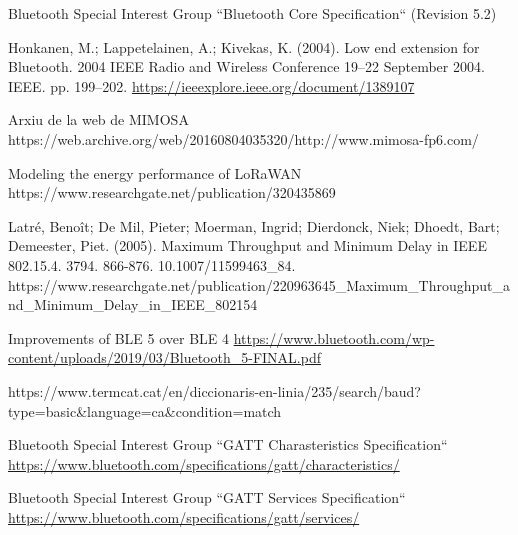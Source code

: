 \begin{thebibliography}{2}


Bluetooth Special Interest Group
``Bluetooth Core Specification``
(Revision 5.2)

Honkanen, M.; Lappetelainen, A.; Kivekas, K. (2004). Low end extension for Bluetooth. 2004 IEEE Radio and Wireless Conference 19–22 September 2004. IEEE. pp. 199–202. \href{https://ieeexplore.ieee.org/document/1389107}{https://ieeexplore.ieee.org/document/1389107}

Arxiu de la web de MIMOSA
https://web.archive.org/web/20160804035320/http://www.mimosa-fp6.com/

Modeling the energy performance of LoRaWAN
https://www.researchgate.net/publication/320435869

Latré, Benoît; De Mil, Pieter; Moerman, Ingrid; Dierdonck, Niek; Dhoedt, Bart; Demeester, Piet. (2005). Maximum Throughput and Minimum Delay in IEEE 802.15.4. 3794. 866-876. 10.1007/11599463\_84. 
https://www.researchgate.net/publication/220963645\_Maximum\_Throughput\_and\_Minimum\_Delay\_in\_IEEE\_802154

Improvements of BLE 5 over BLE 4
\href{https://www.bluetooth.com/wp-content/uploads/2019/03/Bluetooth\_5-FINAL.pdf}{https://www.bluetooth.com/wp-content/uploads/2019/03/Bluetooth\_5-FINAL.pdf}

https://www.termcat.cat/en/diccionaris-en-linia/235/search/baud?type=basic\&language=ca\&condition=match

Bluetooth Special Interest Group
``GATT Charasteristics Specification``
\href{https://www.bluetooth.com/specifications/gatt/characteristics/}{https://www.bluetooth.com/specifications/gatt/characteristics/}

Bluetooth Special Interest Group
``GATT Services Specification``
\href{https://www.bluetooth.com/specifications/gatt/services/}{https://www.bluetooth.com/specifications/gatt/services/}


\end{thebibliography}
